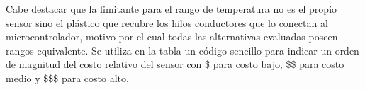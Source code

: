 Cabe destacar que la limitante para el rango de temperatura no es el propio sensor sino el plástico que recubre los hilos conductores que lo conectan al microcontrolador, motivo por el cual todas las alternativas evaluadas poseen rangos equivalente.  Se utiliza en la tabla un código sencillo para indicar un orden de magnitud del costo relativo del sensor con \$ para costo bajo, \$\$ para costo medio y \$\$\$ para costo alto.

\begin{table}[htpb]
\centering
\caption{Alternativas de sensor de temperatura evaluadas.}
\label{tab:temperatura}
\end{table}

